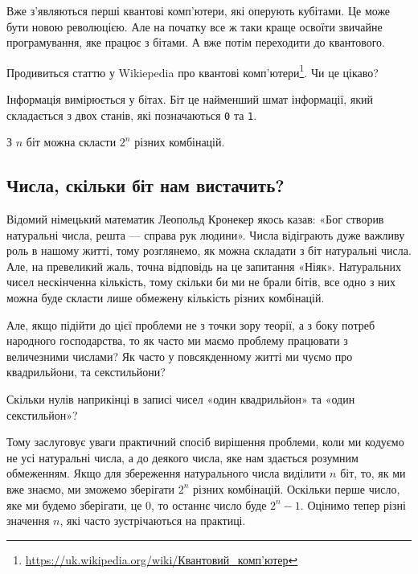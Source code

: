 \documentclass{book}
\newcommand{\bitstr}[1]{{\tt #1}}
\newcommand{\quantumref}{\href{https://uk.wikipedia.org/wiki/\%D0\%9A\%D0\%B2\%D0\%B0\%D0\%BD\%D1\%82\%D0\%BE\%D0\%B2\%D0\%B8\%D0\%B9_\%D0\%BA\%D0\%BE\%D0\%BC\%D0\%BF\%27\%D1\%8E\%D1\%82\%D0\%B5\%D1\%80}{https://uk.wikipedia.org/wiki/Квантовий\_комп'ютер}}
\begin{document}
Вже з'являються перші квантові комп'ютери, які оперують кубітами.
Це може бути новою революцією.
Але на початку все ж таки краще освоїти звичайне програмування, яке працює з бітами.
А вже потім переходити до квантового.

\begin{exercise}
Продивиться статтю у Wikiepedia про квантові комп'ютери\footnote{\quantumref}. Чи це цікаво?
\end{exercise}

\begin{summary}
\item Інформація вимірюється у бітах.  Біт це найменший шмат інформації, який складається з двох станів, які позначаються \bitstr{0} та \bitstr{1}.
\item З $n$ біт можна скласти $2^n$ різних комбінацій.
\end{summary}

\subsection{Числа, скільки біт нам вистачить?}

Відомий німецький математик Леопольд Кронекер якось казав: «Бог створив натуральні числа, решта — справа рук людини».
Числа відіграють дуже важливу роль в нашому житті, тому розглянемо, як можна складати з біт натуральні числа.
Але, на превеликий жаль, точна відповідь на це запитання «Ніяк».
Натуральних чисел нескінченна кількість, тому скільки би ми не брали бітів, все одно з них можна буде скласти лише обмежену кількість різних комбінацій.

Але, якщо підійти до цієї проблеми не з точки зору теорії, а з боку потреб народного господарства, то як часто ми маємо проблему працювати з величезними числами?
Як часто у повсякденному житті ми чуємо про квадрильйони, та секстильйони?

\begin{exercise}
Скільки нулів наприкінці в записі чисел «один квадрильйон» та «один секстильйон»?
\end{exercise}

Тому заслуговує уваги практичний спосіб вирішення проблеми, коли ми кодуємо не усі натуральні числа, а до деякого числа, яке нам здається розумним обмеженням.
Якщо для збереження натурального числа виділити $n$ біт, то, як ми вже знаємо, ми зможемо зберігати $2^n$ різних комбінацій.
Оскільки перше число, яке ми будемо зберігати, це $0$, то останнє число буде $2^n-1$.
Оцінимо тепер різні значення $n$, які часто зустрічаються на практиці.
\end{document}
